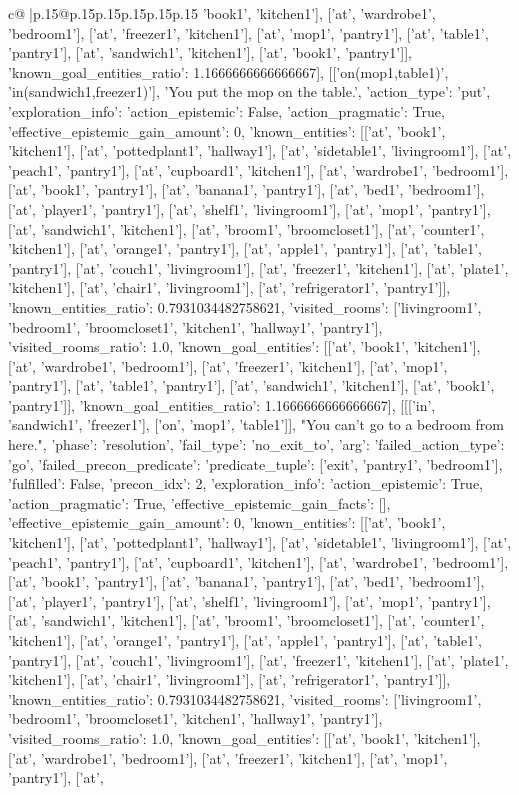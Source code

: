 \documentclass{article}
\begin{document}
{\begin{supertabular}{c@{$\;$}|p{.15\linewidth}@{}p{.15\linewidth}p{.15\linewidth}p{.15\linewidth}p{.15\linewidth}p{.15\linewidth}}
{{{'book1', 'kitchen1'], ['at', 'wardrobe1', 'bedroom1'], ['at', 'freezer1', 'kitchen1'], ['at', 'mop1', 'pantry1'], ['at', 'table1', 'pantry1'], ['at', 'sandwich1', 'kitchen1'], ['at', 'book1', 'pantry1']], 'known_goal_entities_ratio': 1.1666666666666667}}], [['on(mop1,table1)', 'in(sandwich1,freezer1)'], 'You put the mop on the table.', {'action_type': 'put', 'exploration_info': {'action_epistemic': False, 'action_pragmatic': True, 'effective_epistemic_gain_amount': 0, 'known_entities': [['at', 'book1', 'kitchen1'], ['at', 'pottedplant1', 'hallway1'], ['at', 'sidetable1', 'livingroom1'], ['at', 'peach1', 'pantry1'], ['at', 'cupboard1', 'kitchen1'], ['at', 'wardrobe1', 'bedroom1'], ['at', 'book1', 'pantry1'], ['at', 'banana1', 'pantry1'], ['at', 'bed1', 'bedroom1'], ['at', 'player1', 'pantry1'], ['at', 'shelf1', 'livingroom1'], ['at', 'mop1', 'pantry1'], ['at', 'sandwich1', 'kitchen1'], ['at', 'broom1', 'broomcloset1'], ['at', 'counter1', 'kitchen1'], ['at', 'orange1', 'pantry1'], ['at', 'apple1', 'pantry1'], ['at', 'table1', 'pantry1'], ['at', 'couch1', 'livingroom1'], ['at', 'freezer1', 'kitchen1'], ['at', 'plate1', 'kitchen1'], ['at', 'chair1', 'livingroom1'], ['at', 'refrigerator1', 'pantry1']], 'known_entities_ratio': 0.7931034482758621, 'visited_rooms': ['livingroom1', 'bedroom1', 'broomcloset1', 'kitchen1', 'hallway1', 'pantry1'], 'visited_rooms_ratio': 1.0, 'known_goal_entities': [['at', 'book1', 'kitchen1'], ['at', 'wardrobe1', 'bedroom1'], ['at', 'freezer1', 'kitchen1'], ['at', 'mop1', 'pantry1'], ['at', 'table1', 'pantry1'], ['at', 'sandwich1', 'kitchen1'], ['at', 'book1', 'pantry1']], 'known_goal_entities_ratio': 1.1666666666666667}}], [[['in', 'sandwich1', 'freezer1'], ['on', 'mop1', 'table1']], "You can't go to a bedroom from here.", {'phase': 'resolution', 'fail_type': 'no_exit_to', 'arg': {'failed_action_type': 'go', 'failed_precon_predicate': {'predicate_tuple': ['exit', 'pantry1', 'bedroom1'], 'fulfilled': False, 'precon_idx': 2}}, 'exploration_info': {'action_epistemic': True, 'action_pragmatic': True, 'effective_epistemic_gain_facts': [], 'effective_epistemic_gain_amount': 0, 'known_entities': [['at', 'book1', 'kitchen1'], ['at', 'pottedplant1', 'hallway1'], ['at', 'sidetable1', 'livingroom1'], ['at', 'peach1', 'pantry1'], ['at', 'cupboard1', 'kitchen1'], ['at', 'wardrobe1', 'bedroom1'], ['at', 'book1', 'pantry1'], ['at', 'banana1', 'pantry1'], ['at', 'bed1', 'bedroom1'], ['at', 'player1', 'pantry1'], ['at', 'shelf1', 'livingroom1'], ['at', 'mop1', 'pantry1'], ['at', 'sandwich1', 'kitchen1'], ['at', 'broom1', 'broomcloset1'], ['at', 'counter1', 'kitchen1'], ['at', 'orange1', 'pantry1'], ['at', 'apple1', 'pantry1'], ['at', 'table1', 'pantry1'], ['at', 'couch1', 'livingroom1'], ['at', 'freezer1', 'kitchen1'], ['at', 'plate1', 'kitchen1'], ['at', 'chair1', 'livingroom1'], ['at', 'refrigerator1', 'pantry1']], 'known_entities_ratio': 0.7931034482758621, 'visited_rooms': ['livingroom1', 'bedroom1', 'broomcloset1', 'kitchen1', 'hallway1', 'pantry1'], 'visited_rooms_ratio': 1.0, 'known_goal_entities': [['at', 'book1', 'kitchen1'], ['at', 'wardrobe1', 'bedroom1'], ['at', 'freezer1', 'kitchen1'], ['at', 'mop1', 'pantry1'], ['at', }}}
\end{supertabular}}
\end{document}
